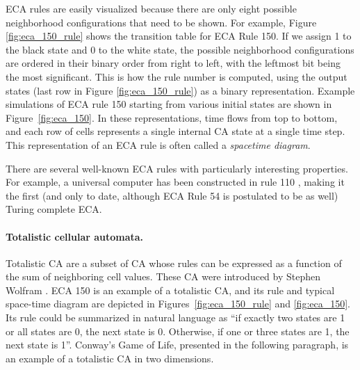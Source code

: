 \ac{ECA} rules are easily visualized because there are only eight possible
neighborhood configurations that need to be shown. For example, Figure
\ref{fig:eca_150_rule} shows the transition table for \ac{ECA} Rule 150. If we
assign 1 to the black state and 0 to the white state, the possible neighborhood
configurations are ordered in their binary order from right to left, with the
leftmost bit being the most significant. This is how the rule number is
computed, using the output states (last row in Figure \ref{fig:eca_150_rule}) as
a binary representation. Example simulations of \ac{ECA} rule 150 starting 
from various initial states are shown in Figure~\ref{fig:eca_150}. In these 
representations, time flows from top to bottom, and each row of cells represents 
a single internal \ac{CA} state at a single time step. This representation of an \ac{ECA} rule is often called a \emph{spacetime diagram}.

There are several well-known \ac{ECA} rules with particularly interesting
properties. For example, a universal computer has been constructed in rule 110
\parencite{cookUniversalityElementaryCellular2004}, making it the first (and
only to date, although \ac{ECA} Rule 54 is postulated to be as well) Turing complete \ac{ECA}.

\paragraph{Totalistic cellular automata.}
Totalistic \ac{CA} are a subset of \ac{CA} whose rules can be expressed as a
function of the sum of neighboring cell values. These \ac{CA} were introduced by
Stephen Wolfram \parencite{wolframStatisticalMechanicsCellular1983}. \ac{ECA} 150 is 
an example of a totalistic \ac{CA}, and its rule and typical space-time diagram are depicted in Figures~\ref{fig:eca_150_rule} and \ref{fig:eca_150}. Its rule could be summarized 
in natural language as 
``if exactly two states are 1 or all states are 0, the next state is 0. Otherwise, if 
one or three states are 1, the next state is 1''. Conway's Game of Life, presented 
in the following paragraph, is an example
of a totalistic \ac{CA} in two dimensions.

